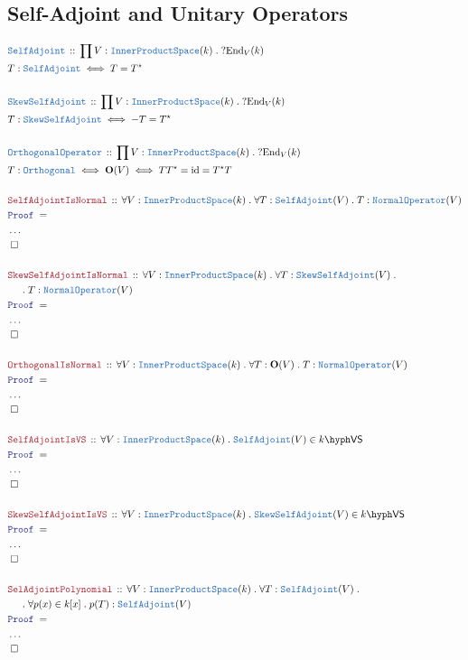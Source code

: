 \documentclass[12pt]{scrartcl}%
\newcommand{\TYPE}[1]{\textcolor{NavyBlue}{\mathtt{#1}}}%
\newcommand{\LOGIC}[1]{\textcolor{Blue}{\mathtt{#1}}}%
\newcommand{\THM}[1]{\textcolor{Maroon}{\mathtt{#1}}}%
\renewcommand{\.}{\; . \;} %
\newcommand{\Theorem}[2]{& \THM{#1} \, :: \, #2 \\ & \Proof = \\ } %
\newcommand{\DeclareType}[2]{& \TYPE{#1} \, :: \, #2 \\}%
\newcommand{\DefineType}[3]{& #1 : \TYPE{#2} \iff #3 \\}%
\newcommand{\DefineNamedType}[4]{& #1 : \TYPE{#2} \iff #3 \iff #4 \\}%
\newcommand{\NewLine}{\\ & \kern 1pc}%
\newcommand{\Page}[1]{ \begin{align*} #1 \end{align*}  }%
\newcommand{\NoProof}{ & \ldots \\ \EndProof}%
\DeclareMathOperator*{\id}{id}%
\newcommand{\End}{\mathrm{End}}%
\newcommand{\QED}{\; \square} %
\newcommand{\EndProof}{& \QED \\} %
\newcommand{\Proof}{\LOGIC{Proof} \; } %
\newcommand{\IPS}{\TYPE{InnerProductSpace}}
\newcommand{\NO}{\TYPE{NormalOperator}}
\newcommand{\SA}{\TYPE{SelfAdjoint}}
\newcommand{\SSA}{\TYPE{SkewSelfAdjoint}}
\newcommand{\VS}[1]{#1\hyph\mathsf{VS}} %
\renewcommand{\O}{\mathbf{O}}
\begin{document}
\subsection{Self-Adjoint and Unitary Operators}
\Page{
	\DeclareType{\SA}{\prod V : \IPS(k) \. ?\End_V(k)}
	\DefineType{T}{\SA}{T=T^\star}
	\\
	\DeclareType{\SSA}{\prod V : \IPS(k) \. ?\End_V(k)}
	\DefineType{T}{\SSA}{-T=T^\star}
	\\
	\DeclareType{OrthogonalOperator}{ \prod V : \IPS(k) \. ?\End_V(k)}
	\DefineNamedType{T}{Orthogonal}{\O(V)}{ T T^\star = \id = T^\star T}
	\\
	\Theorem{SelfAdjointIsNormal}{\forall V : \IPS(k) \. \forall T : \SA(V) \. T : \NO(V)}
	\NoProof
	\\
	\Theorem{SkewSelfAdjointIsNormal}{\forall V : \IPS(k) \. \forall T : \SSA(V) \. \NewLine \. T : \NO(V)}
	\NoProof
	\\
	\Theorem{OrthogonalIsNormal}{\forall V : \IPS(k) \. \forall T : \O(V) \. T : \NO(V)}
	\NoProof
	\\
	\Theorem{SelfAdjointIsVS}{\forall V : \IPS(k) \. \SA(V) \in \VS{k}}
	\NoProof
	\\
	\Theorem{SkewSelfAdjointIsVS}{\forall V : \IPS(k) \. \SSA(V) \in \VS{k}}
	\NoProof
	\\
	\Theorem{SelAdjointPolynomial}{\forall V : \IPS(k) \. \forall T : \SA(V) \. \NewLine \. \forall p(x) \in k[x] \. p(T) : \SA(V)  }
	\NoProof
}
\end{document}
